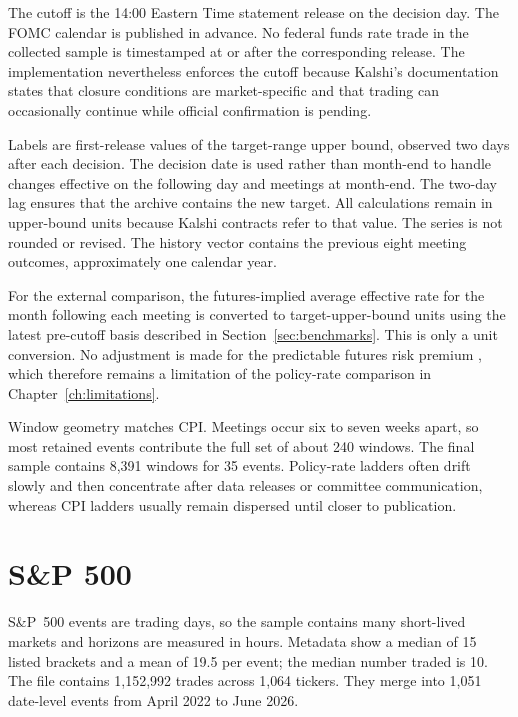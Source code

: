 \documentclass[12pt,a4paper]{report}
\begin{document}
The cutoff is the 14:00 Eastern Time statement release on the decision day.
The FOMC calendar is published in advance. No federal funds rate trade in the
collected sample is timestamped at or after the corresponding release. The
implementation nevertheless enforces the cutoff because Kalshi's documentation
states that closure conditions are market-specific and that trading can
occasionally continue while official confirmation is pending.

Labels are first-release values of the target-range upper bound, observed two
days after each decision. The decision date is used rather than month-end to
handle changes effective on the following day and meetings at month-end. The
two-day lag ensures that the archive contains the new target. All calculations
remain in upper-bound units because Kalshi contracts refer to that value. The
series is not rounded or revised. The history vector contains the previous
eight meeting outcomes, approximately one calendar year.

For the external comparison, the futures-implied average effective rate for the
month following each meeting is converted to target-upper-bound units using the
latest pre-cutoff basis described in Section~\ref{sec:benchmarks}. This is only
a unit conversion. No adjustment is made for the predictable futures risk
premium \parencite{piazzesi2008}, which therefore remains a limitation of the
policy-rate comparison in Chapter~\ref{ch:limitations}.

Window geometry matches CPI. Meetings occur six to seven weeks apart, so most
retained events contribute the full set of about 240 windows. The final sample
contains 8{,}391 windows for 35 events. Policy-rate ladders often drift slowly
and then concentrate after data releases or committee communication, whereas
CPI ladders usually remain dispersed until closer to publication.




\section{S\&P 500}
\label{sec:data-sp500}

S\&P~500 events are trading days, so the sample contains many short-lived
markets and horizons are measured in hours. Metadata show a median of 15
listed brackets and a mean of 19.5 per event; the median number traded is 10.
The file contains 1{,}152{,}992 trades across 1{,}064 tickers. They merge into
1{,}051 date-level events from April 2022 to June 2026.
\end{document}
